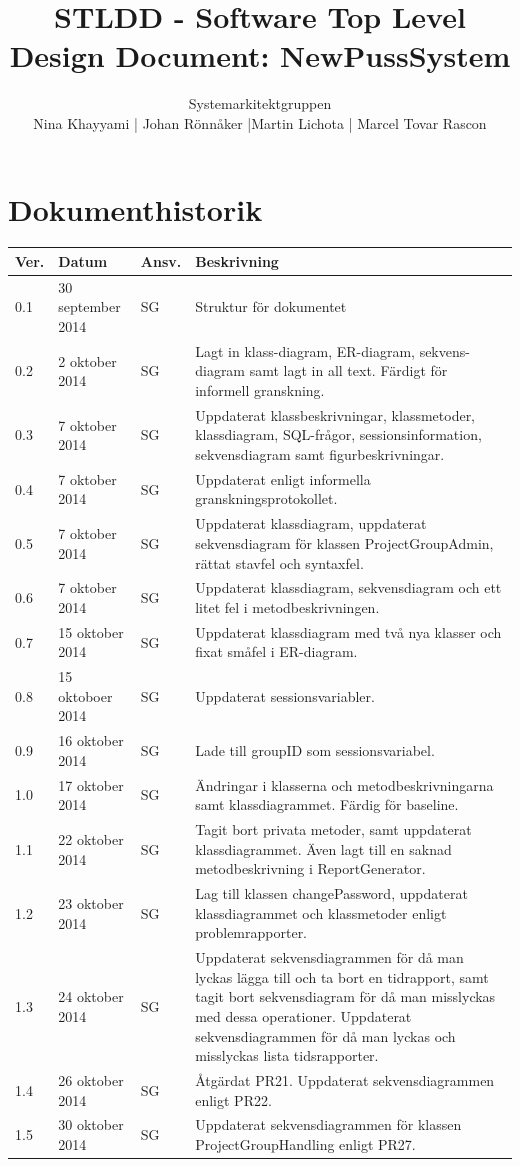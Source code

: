 \documentclass[a4paper]{article}
\title{STLDD - Software Top Level Design Document: NewPussSystem}
\author{Systemarkitektgruppen \\ Nina Khayyami | Johan Rönnåker |Martin Lichota | Marcel Tovar Rascon}
\date{}
\begin{document}
\maketitle
\thispagestyle{fancy}
\tableofcontents
\newpage

\section*{Dokumenthistorik}

\begin{tabular}{ l l l p{8.5cm} }
Ver. & Datum & Ansv. & Beskrivning \\\hline
0.1 & 30 september 2014 & SG & Struktur för dokumentet\\
0.2 & 2 oktober 2014 & SG & Lagt in klass-diagram, ER-diagram, sekvens-diagram samt lagt in all text. Färdigt för informell granskning.\\
0.3 & 7 oktober 2014 & SG & Uppdaterat klassbeskrivningar, klassmetoder, klassdiagram, SQL-frågor, sessionsinformation, sekvensdiagram samt figurbeskrivningar.\\
0.4 & 7 oktober 2014 & SG & Uppdaterat enligt informella granskningsprotokollet.\\
0.5 & 7 oktober 2014 & SG & Uppdaterat klassdiagram, uppdaterat sekvensdiagram för klassen ProjectGroupAdmin, rättat stavfel och syntaxfel.\\
0.6 & 7 oktober 2014 & SG & Uppdaterat klassdiagram, sekvensdiagram och ett litet fel i metodbeskrivningen.\\
0.7 & 15 oktober 2014 & SG & Uppdaterat klassdiagram med två nya klasser och fixat småfel i ER-diagram.\\
0.8 & 15 oktoboer 2014 & SG & Uppdaterat sessionsvariabler.\\
0.9 & 16 oktober 2014 & SG & Lade till groupID som sessionsvariabel.\\
1.0 & 17 oktober 2014 & SG & Ändringar i klasserna och metodbeskrivningarna samt klassdiagrammet. Färdig för baseline.\\
1.1 & 22 oktober 2014 & SG & Tagit bort privata metoder, samt uppdaterat klassdiagrammet. Även lagt till en saknad metodbeskrivning i ReportGenerator.\\
1.2 & 23 oktober 2014 & SG & Lag till klassen changePassword, uppdaterat klassdiagrammet och klassmetoder enligt problemrapporter. \\
1.3 & 24 oktober 2014 & SG & Uppdaterat sekvensdiagrammen för då man lyckas lägga till och ta bort en tidrapport, samt tagit bort sekvensdiagram för då man misslyckas med dessa operationer. Uppdaterat sekvensdiagrammen för då man lyckas och misslyckas lista tidsrapporter. \\
1.4 & 26 oktober 2014 & SG & Åtgärdat PR21. Uppdaterat sekvensdiagrammen enligt PR22.\\
1.5 & 30 oktober 2014 & SG & Uppdaterat sekvensdiagrammen för klassen ProjectGroupHandling enligt PR27.

\end{tabular}
\newpage
\end{document}
